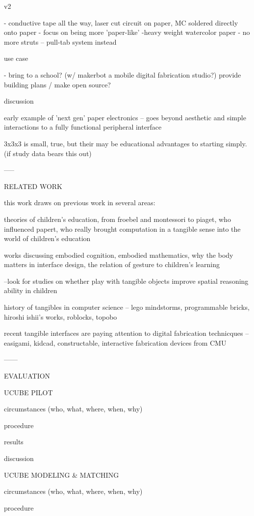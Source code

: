 v2

- conductive tape all the way, laser cut circuit on paper, MC soldered directly
onto paper
- focus on being more 'paper-like'
-heavy weight watercolor paper
- no more struts -- pull-tab system instead

use case

- bring to a school? (w/ makerbot a mobile digital fabrication studio?) provide
building plans / make open source?

discussion

early example of 'next gen' paper electronics -- goes beyond aesthetic and
simple interactions to a fully functional peripheral interface

3x3x3 is small, true, but their may be educational advantages to starting
simply. (if study data bears this out)


-----

RELATED WORK

this work draws on previous work in several areas:

theories of children's education, from froebel and montessori to piaget, who
influenced papert, who really brought computation in a tangible sense into the
world of children's education

works discussing embodied cognition, embodied mathematics, why the body matters
in interface design, the relation of gesture to children's learning

--look for studies on whether play with tangible objects improve spatial
reasoning ability in children

history of tangibles in computer science -- lego mindstorms, programmable
bricks, hiroshi ishii's works, roblocks, topobo

recent tangible interfaces are paying attention to digital fabrication
technicques -- easigami, kidcad, constructable, interactive fabrication devices
from  CMU


------

EVALUATION


UCUBE PILOT

circumstances (who, what, where, when, why)

procedure

results

discussion 



UCUBE MODELING & MATCHING

circumstances (who, what, where, when, why)

procedure


